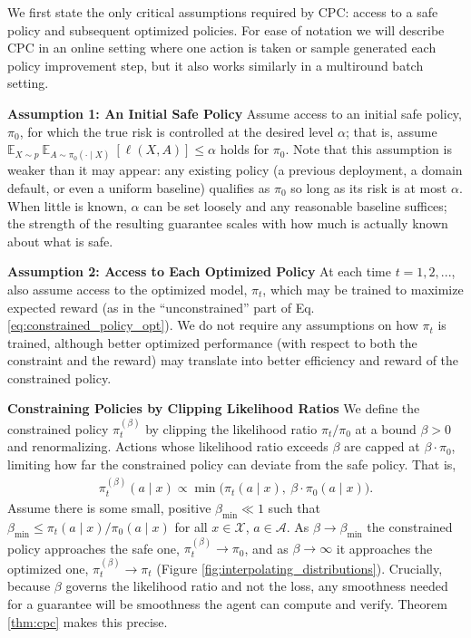 We first state the only critical assumptions required by CPC: access to a safe policy and subsequent optimized policies. For ease of notation we will describe CPC in an online setting where one action is taken or sample generated each policy improvement step, but it also works similarly in a multiround batch setting.


\textbf{Assumption 1: An Initial Safe Policy} Assume access to an initial safe policy, $\pi_{0}$, for which the true risk is controlled at the desired level $\alpha$; that is, assume $\mathbb{E}_{X \sim p} \ \mathbb{E}_{A \sim \pi_{0}(\cdot \mid X)} \ [\ell(X, A)] \leq \alpha$
holds for $\pi_{0}$.
Note that this assumption is weaker than it may appear: any existing policy (a previous deployment, a domain default, or even a uniform baseline) qualifies as $\pi_0$ so long as its risk is at most $\alpha$. When little is known, $\alpha$ can be set loosely and any reasonable baseline suffices; the strength of the resulting guarantee scales with how much is actually known about what is safe.

\textbf{Assumption 2: Access to Each Optimized Policy} At each time $t = 1, 2, ...$, also assume access to the optimized model, $\pi_{t}$, which may be trained to maximize expected reward (as in the ``unconstrained'' part of Eq. \eqref{eq:constrained_policy_opt}). We do not require any assumptions on how $\pi_{t}$ is trained, although better optimized performance (with respect to both the constraint and the reward) may translate into better efficiency and reward of the constrained policy.


\textbf{Constraining Policies by Clipping Likelihood Ratios} We define the constrained policy $\pi_{t}^{(\beta)}$ by clipping the likelihood ratio $\pi_t / \pi_0$ at a bound $\beta > 0$ and renormalizing. Actions whose likelihood ratio exceeds $\beta$ are capped at $\beta \cdot \pi_0$, limiting how far the constrained policy can deviate from the safe policy. That is,
\begin{align}\label{eq:piecewise_constraint_def}
\pi_{t}^{(\beta)}(a \mid x) \propto \min\big(\pi_{t}(a \mid x), \ \beta\cdot \pi_{0}(a \mid x)\big) .
\end{align}
Assume there is some small, positive $\beta_{\min}\ll1$ such that $\beta_{\min}\leq \pi_t(a \mid x)/\pi_0(a \mid x)$ for all $x\in \mathcal{X}$, $a \in \mathcal{A}$. As $\beta \to \beta_{\min}$ the constrained policy approaches the safe one, $\pi_t^{(\beta)} \to \pi_0$, and as $\beta \to \infty$ it approaches the optimized one, $\pi_t^{(\beta)} \to \pi_t$ (Figure \ref{fig:interpolating_distributions}). Crucially, because $\beta$ governs the likelihood ratio and not the loss, any smoothness needed for a guarantee will be smoothness the agent can compute and verify. Theorem \ref{thm:cpc} makes this precise.



